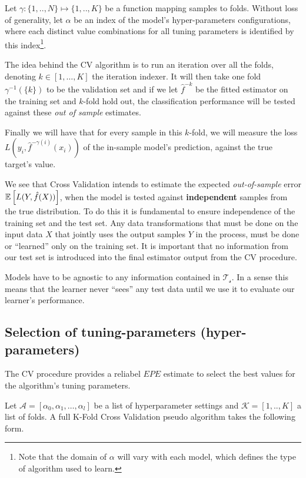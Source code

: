 Let $\gamma : \{1,..,N\} \mapsto \{1, .., K\}$ be a function mapping samples to folds.
Without loss of generality, let $\alpha$ be an index of the model's hyper-parameters configurations, where each distinct value combinations for all tuning parameters is identified by this index\footnote{ Note that the domain of $\alpha$ will vary with each model, which defines the type of algorithm used to learn.}.

The idea behind the CV algorithm is to run an iteration over all the folds, denoting $k \in [1,\ldots,K]$ the iteration indexer.
It will then take one fold $\gamma^{-1}(\{k\})$ to be the validation set and if we let $\hat{f}^{-k}$ be the fitted estimator on the training set and $k$-fold hold out, the classification performance will be tested against these \textit{out of sample} estimates.

Finally we will have that for every sample in this $k$-fold, we will measure the loss $L(y_i, \hat{f}^{-\gamma(i)}(x_i))$ of the in-sample model's prediction, against the true target's value.

We see that Cross Validation intends to estimate the expected \textit{out-of-sample} error $\operatorname{\mathbb{E}} \left[ L(Y, \hat{f}(X)) \right]$, when the model is tested against \textbf{independent} samples from the true distribution.
To do this it is fundamental to ensure independence of the training set and the test set.
Any data transformations that must be done on the input data $X$ that jointly uses the output samples $Y$ in the process, must be done or ``learned'' only on the training set.
It is important that no information from our test set is introduced into the final estimator output from the CV procedure.

Models have to be agnostic to any information contained in $\mathcal{T_s}$.
In a sense this means that the learner never ``sees'' any test data until we use it to evaluate our learner's performance.


\subsection{Selection of tuning-parameters (hyper-parameters) }\label{subsection:selection_hyper_params}

The CV procedure provides a reliabel $EPE$ estimate to select the best values for the algorithm's tuning parameters.

 Let $\mathcal{A} = [\alpha_0, \alpha_1,\ldots, \alpha_l  ]$ be a list of hyperparameter settings and $\mathcal{K} =[1,..,K]$ a list of folds.
A full K-Fold Cross Validation pseudo algorithm takes the following form.

